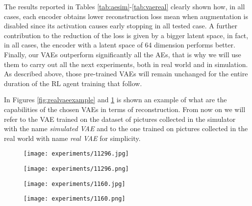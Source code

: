 The results reported in Tables \ref{tab:aesim}-\ref{tab:vaereal} clearly shown how, in all cases, each encoder obtains lower reconstruction loss mean when augmentation is disabled since its activation causes early stopping in all tested case. A further contribution to the reduction of the loss is given by a bigger latent space, in fact, in all cases, the encoder with a latent space of 64 dimension performs better. Finally, our VAEs outperform significantly all the AEs, that is why we will use them to carry out all the next experiments, both in real world and in simulation.
As described above, those pre-trained VAEs will remain unchanged for the entire duration of the RL agent training that follow. 

In Figures \ref{fig:realvaeexample} and \ref{fig:simvaeexample} is shown an example of what are the capabilities of the chosen VAEs in terms of reconstruction. From now on we will refer to the VAE trained on the dataset of pictures collected in the simulator with the name \textit{simulated VAE} and to the one trained on pictures collected in the real world with name \textit{real VAE} for simplicity. 


\begin{figure}[h]
  \begin{minipage}{.50\textwidth}
    \centering
    \texttt{[image: experiments/11296.jpg]}
  \end{minipage}%
  \begin{minipage}{.50\textwidth}
      \centering
      \texttt{[image: experiments/11296.png]}
  \end{minipage}
  \label{fig:realvaeexample}
  \begin{minipage}{.50\textwidth}
    \centering
    \texttt{[image: experiments/1160.jpg]}
  \end{minipage}%
  \begin{minipage}{.50\textwidth}
      \centering
      \texttt{[image: experiments/1160.png]}
  \end{minipage}
  \label{fig:simvaeexample}
\end{figure}

